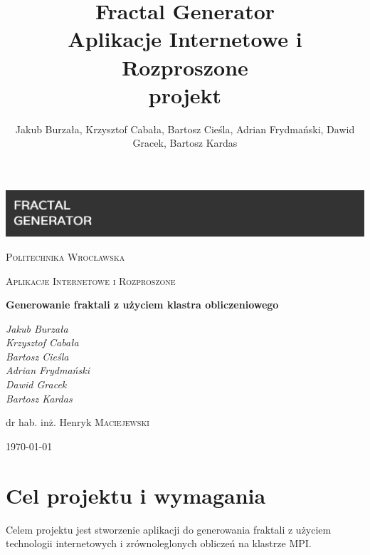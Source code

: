 \documentclass[a4paper]{article}
\title{\textbf{Fractal Generator} \\ Aplikacje Internetowe i Rozproszone \\ projekt}
\author{Jakub Burzała, Krzysztof Cabała, Bartosz Cieśla, Adrian Frydmański, Dawid Gracek, Bartosz Kardas}
\begin{document}
\begin{titlepage}
	\centering
	\includegraphics[width=\textwidth]{banner2.png}\par\vspace{1cm}
	{\scshape\LARGE Politechnika Wrocławska \par}
	\vspace{1cm}
	{\scshape\Large Aplikacje Internetowe i Rozproszone\par}
	\vspace{1.5cm}
	{\huge\bfseries Generowanie fraktali z użyciem klastra obliczeniowego \par}
	\vspace{2cm}
	{\Large\itshape Jakub Burzała \\ Krzysztof Cabała \\ Bartosz Cieśla \\ Adrian Frydmański \\ Dawid Gracek \\ Bartosz Kardas \par}
	\vfill
	dr hab. inż. Henryk \textsc{Maciejewski}

	\vfill

	{\large \today\par}
\end{titlepage}

\newpage
\clearpage
\tableofcontents
\newpage

\section{Cel projektu i wymagania}
Celem projektu jest stworzenie aplikacji do generowania fraktali z użyciem technologii internetowych i zrównoleglonych obliczeń na klastrze MPI.
\end{document}

